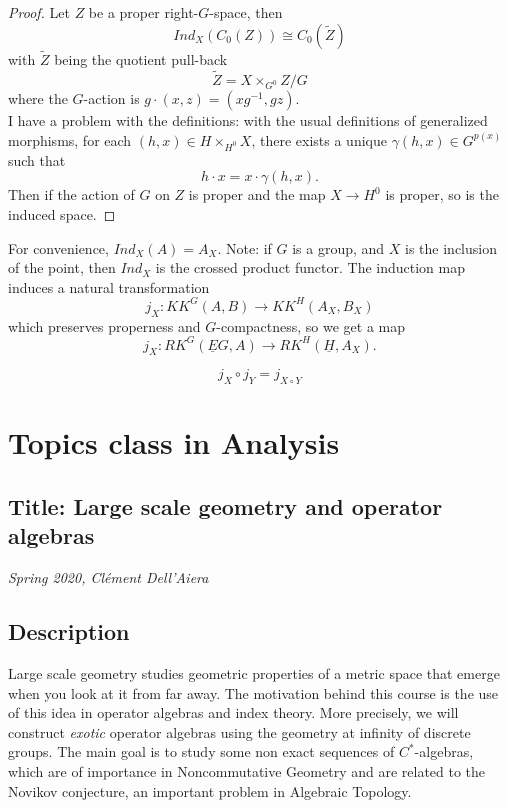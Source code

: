 \begin{proof}
Let $Z$ be a proper right-$G$-space, then 
\[Ind_X(C_0(Z)) \cong C_0(\tilde Z)\] 
with $\tilde Z$ being the quotient pull-back \[\tilde Z = X\times_{G^0} Z/G\] 
where the $G$-action is $g\cdot (x,z) = (xg^{-1},gz)$.\\

I have  a problem with the definitions: with the usual definitions of generalized morphisms, for each $(h,x)\in H\times_{H^0} X$, there exists a unique $\gamma(h,x)\in G^{p(x)}$ such that
\[h\cdot x = x \cdot \gamma(h,x).\]
Then if the action of $G$ on $Z$ is proper and the map $X\rightarrow H^0$ is proper, so is the induced space.
\end{proof}

For convenience, $Ind_X(A) = A_X$. Note: if $G$ is a group, and $X$ is the inclusion of the point, then $Ind_X$ is the crossed product functor. The induction map induces a natural transformation
\[j_X : KK^G(A,B) \rightarrow KK^H(A_X,B_X)\]
which preserves properness and $G$-compactness, so we get a map
\[j_X : RK^G(\underline EG , A)\rightarrow RK^H(\underline H, A_X).\]

\begin{lem}
\[j_X\circ j_Y  = j_{X\circ Y}\]
\end{lem}
\newpage
\section{Topics class in Analysis}

\subsection*{Title: Large scale geometry and operator algebras}
\textit{Spring 2020, Cl\'ement Dell'Aiera}
\subsection*{Description} 
Large scale geometry studies geometric properties of a metric space that emerge when you look at it from far away. The motivation behind this course is the use of this idea in operator algebras and index theory. More precisely, we will construct \textit{exotic} operator algebras using the geometry at infinity of discrete groups. The main goal is to study some non exact sequences of $C^*$-algebras, which are of importance in Noncommutative Geometry and are related to the Novikov conjecture, an important problem in Algebraic Topology.

